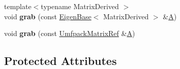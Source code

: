\begin{DoxyCompactItemize}
{\footnotesize template$<$typename Matrix\+Derived $>$ }\\void {\bfseries grab} (const \hyperlink{group___core___module_struct_eigen_1_1_eigen_base}{Eigen\+Base}$<$ Matrix\+Derived $>$ \&\hyperlink{group___core___module_class_eigen_1_1_matrix}{A})
\item 
\mbox{\label{class_eigen_1_1_umf_pack_l_u_ac17fdc73306848870023e90bd3da8b70}} 
void {\bfseries grab} (const \hyperlink{group___core___module}{Umfpack\+Matrix\+Ref} \&\hyperlink{group___core___module_class_eigen_1_1_matrix}{A})
\end{DoxyCompactItemize}
\subsection*{Protected Attributes}
